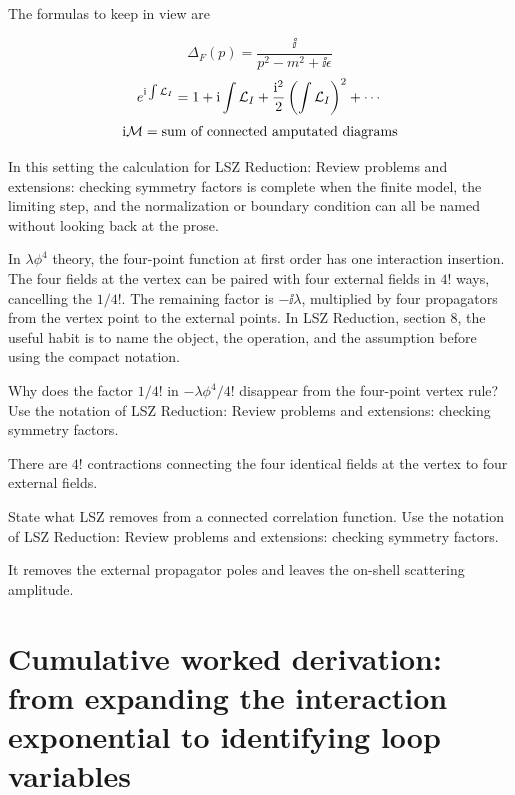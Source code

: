 The formulas to keep in view are

\[
  \Delta_F(p)=\frac{\ii}{p^2-m^2+\ii\epsilon}
\]
\[
  e^{\mathrm i\int\mathcal L_I}=1+\mathrm i\int\mathcal L_I+\frac{\mathrm i^2}{2}\left(\int\mathcal L_I\right)^2+\cdots
\]
\[
  \mathrm i\mathcal M=\hbox{sum of connected amputated diagrams}
\]

In this setting the calculation for LSZ Reduction: Review problems and extensions: checking symmetry factors is complete when the finite model, the limiting step, and the normalization or boundary condition can all be named without looking back at the prose.




\begin{example}
In \(\lambda\phi^4\) theory, the four-point function at first order has one interaction insertion.  The four fields at the vertex can be paired with four external fields in \(4!\) ways, cancelling the \(1/4!\).  The remaining factor is \(-\ii\lambda\), multiplied by four propagators from the vertex point to the external points.  In LSZ Reduction, section 8, the useful habit is to name the object, the operation, and the assumption before using the compact notation.
\end{example}



\begin{exercise}
Why does the factor \(1/4!\) in \(-\lambda\phi^4/4!\) disappear from the four-point vertex rule?  Use the notation of LSZ Reduction: Review problems and extensions: checking symmetry factors.
\begin{answer}
There are \(4!\) contractions connecting the four identical fields at the vertex to four external fields.
\end{answer}
\end{exercise}

\begin{exercise}
State what LSZ removes from a connected correlation function.  Use the notation of LSZ Reduction: Review problems and extensions: checking symmetry factors.
\begin{answer}
It removes the external propagator poles and leaves the on-shell scattering amplitude.
\end{answer}
\end{exercise}



\section{Cumulative worked derivation: from expanding the interaction exponential to identifying loop variables}

